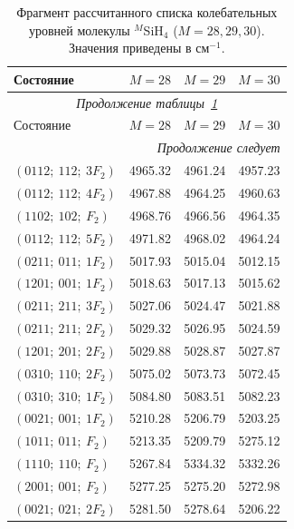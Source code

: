 \begingroup
\small
\setlength{\tabcolsep}{5pt}
\renewcommand{\arraystretch}{1.05}
\begin{longtable}{lccc}
\caption{Фрагмент рассчитанного списка колебательных уровней молекулы ${}^{M}$SiH$_4$ ($M=28,29,30$). Значения приведены в см$^{-1}$.}\label{tab:si_predicted_band_centers}\\
\hline
Состояние & $M=28$ & $M=29$ & $M=30$ \\
\hline
\endfirsthead
\hline
\multicolumn{4}{c}{\small\slshape Продолжение таблицы~\ref{tab:si_predicted_band_centers}}\\
\hline
Состояние & $M=28$ & $M=29$ & $M=30$ \\
\hline
\endhead
\hline
\multicolumn{4}{r}{\small\slshape Продолжение следует}\\
\endfoot
\hline\hline
\endlastfoot
$( 0 1 1 2;~   1 1 2;~   3 F_2  )$&  4965.32 &  4961.24 &  4957.23 \\
$( 0 1 1 2;~   1 1 2;~   4 F_2  )$&  4967.88 &  4964.25 &  4960.63 \\
$( 1 1 0 2;~   1 0 2;~     F_2  )$&  4968.76 &  4966.56 &  4964.35 \\
$( 0 1 1 2;~   1 1 2;~   5 F_2  )$&  4971.82 &  4968.02 &  4964.24 \\
$( 0 2 1 1;~   0 1 1;~   1 F_2  )$&  5017.93 &  5015.04 &  5012.15 \\
$( 1 2 0 1;~   0 0 1;~   1 F_2  )$&  5018.63 &  5017.13 &  5015.62 \\
$( 0 2 1 1;~   2 1 1;~   3 F_2  )$&  5027.06 &  5024.47 &  5021.88 \\
$( 0 2 1 1;~   2 1 1;~   2 F_2  )$&  5029.32 &  5026.95 &  5024.59 \\
$( 1 2 0 1;~   2 0 1;~   2 F_2  )$&  5029.88 &  5028.87 &  5027.87 \\
$( 0 3 1 0;~   1 1 0;~   2 F_2  )$&  5075.02 &  5073.73 &  5072.45 \\
$( 0 3 1 0;~   3 1 0;~   1 F_2  )$&  5084.80 &  5083.51 &  5082.23 \\
$( 0 0 2 1;~   0 0 1;~   1 F_2  )$&  5210.28 &  5206.79 &  5203.25 \\
$( 1 0 1 1;~   0 1 1;~     F_2  )$&  5213.35 &  5209.79 &  5275.12 \\
$( 1 1 1 0;~   1 1 0;~     F_2  )$&  5267.84 &  5334.32 &  5332.26 \\
$( 2 0 0 1;~   0 0 1;~     F_2  )$&  5277.25 &  5275.20 &  5272.98 \\
$( 0 0 2 1;~   0 2 1;~   2 F_2  )$&  5281.50 &  5278.64 &  5206.22 \\

\end{longtable}

